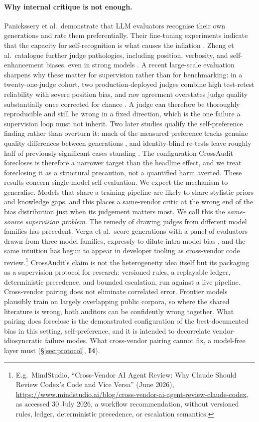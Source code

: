 \documentclass[11pt]{article}
\newcommand{\invariant}[1]{\textbf{I#1}}
\begin{document}
\paragraph{Why internal critique is not enough.} Panickssery et al.\ demonstrate that LLM evaluators recognise their own generations and rate them preferentially. Their fine-tuning experiments indicate that the capacity for self-recognition is what causes the inflation \cite{panickssery2024}. Zheng et al.\ catalogue further judge pathologies, including position, verbosity, and self-enhancement biases, even in strong models \cite{zheng2023}. A recent large-scale evaluation sharpens why these matter for supervision rather than for benchmarking: in a twenty-one-judge cohort, two production-deployed judges combine high test-retest reliability with severe position bias, and raw agreement overstates judge quality substantially once corrected for chance \cite{norman2026reliability}. A judge can therefore be thoroughly reproducible and still be wrong in a fixed direction, which is the one failure a supervision loop must not inherit. Two later studies qualify the self-preference finding rather than overturn it: much of the measured preference tracks genuine quality differences between generations \cite{chen2025selfpref}, and identity-blind re-tests leave roughly half of previously significant cases standing \cite{roytburg2026sanity}. The configuration CrossAudit forecloses is therefore a narrower target than the headline effect, and we treat foreclosing it as a structural precaution, not a quantified harm averted. These results concern single-model self-evaluation. We expect the mechanism to generalise. Models that share a training pipeline are likely to share stylistic priors and knowledge gaps, and this places a same-vendor critic at the wrong end of the bias distribution just when its judgement matters most. We call this the \emph{same-source supervision problem}. The remedy of drawing judges from different model families has precedent. Verga et al.\ score generations with a panel of evaluators drawn from three model families, expressly to dilute intra-model bias \cite{verga2024poll}, and the same intuition has begun to appear in developer tooling as cross-vendor code review.\footnote{E.g.\ MindStudio, ``Cross-Vendor AI Agent Review: Why Claude Should Review Codex's Code and Vice Versa'' (June 2026), \url{https://www.mindstudio.ai/blog/cross-vendor-ai-agent-review-claude-codex}, as accessed 30 July 2026, a workflow recommendation, without versioned rules, ledger, deterministic precedence, or escalation semantics.} CrossAudit's claim is not the heterogeneity idea itself but its packaging as a supervision protocol for research: versioned rules, a replayable ledger, deterministic precedence, and bounded escalation, run against a live pipeline. Cross-vendor pairing does not eliminate correlated error. Frontier models plausibly train on largely overlapping public corpora, so where the shared literature is wrong, both auditors can be confidently wrong together. What pairing does foreclose is the demonstrated configuration of the best-documented bias in this setting, self-preference, and it is intended to decorrelate vendor-idiosyncratic failure modes. What cross-vendor pairing cannot fix, a model-free layer must (\S\ref{sec:protocol}, \invariant{4}).
\end{document}
